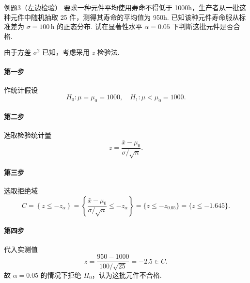 \begin{question}{例题3（左边检验）}
    要求一种元件平均使用寿命不得低于 1000h，生产者从一批这种元件中随机抽取 25 件，测得其寿命的平均值为 950h. 已知该种元件寿命服从标准差为 $\sigma = 100 \,\mathrm{h}$ 的正态分布. 试在显著性水平 $\alpha=0.05$ 下判断这批元件是否合格.
\end{question}
\begin{solution}
    由于方差 $\sigma^2$ 已知，考虑采用 $z$ 检验法.
    \paragraph{第一步} 作统计假设
    $$
        H_0: \mu=\mu_0=1000, \quad H_1: \mu<\mu_0=1000.
    $$
    \paragraph{第二步} 选取检验统计量
    $$
        z = \frac{\bar{x}-\mu_0}{\sigma/\sqrt{n}} .
    $$
    \paragraph{第三步} 选取拒绝域
    $$
        C = \left\{z \leqslant -z_{\alpha}\right\}
        = \left\{\frac{\bar{x}-\mu_0}{\sigma/\sqrt{n}} \leqslant -z_{\alpha}\right\}
        = \{z \leqslant -z_{0.05}\}
        = \{z \leqslant -1.645\}.
    $$
    \paragraph{第四步} 代入实测值
    $$
        z = \frac{950-1000}{100/\sqrt{25}} = -2.5 \in C.
    $$
    故 $\alpha = 0.05$ 的情况下拒绝 $H_0$，认为这批元件不合格.
\end{solution}



